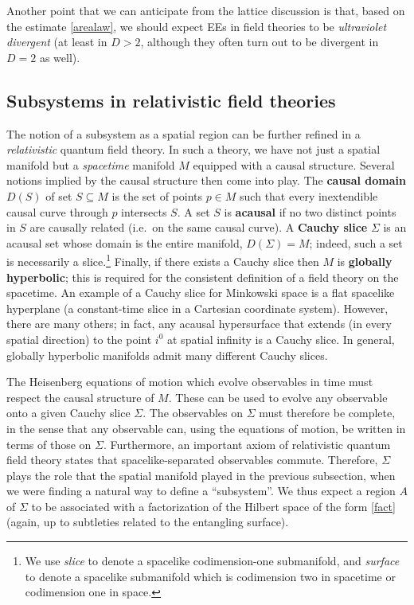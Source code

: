 \documentclass[11pt]{article}
\begin{document}
Another point that we can anticipate from the lattice discussion is that, based on the estimate \eqref{arealaw}, we should expect EEs in field theories to be \emph{ultraviolet divergent} (at least in $D>2$, although they often turn out to be divergent in $D=2$ as well).


\subsection{Subsystems in relativistic field theories}
\label{sec:subsystem relativistic}

The notion of a subsystem as a spatial region can be further refined in a \emph{relativistic} quantum field theory. In such a theory, we have not just a spatial manifold but a \emph{spacetime} manifold $M$ equipped with a causal structure. Several notions implied by the causal structure then come into play. The \textbf{causal domain} $D(S)$ of set $S\subseteq M$ is the set of points $p\in M$ such that every inextendible causal curve through $p$ intersects $S$. A set $S$ is \textbf{acausal} if no two distinct points in $S$ are causally related (i.e.\ on the same causal curve). A \textbf{Cauchy slice} $\Sigma$ is an acausal set whose domain is the entire manifold, $D(\Sigma) = M$; indeed, such a set is necessarily a slice.\footnote{We use \emph{slice} to denote a spacelike codimension-one submanifold, and \emph{surface} to denote a spacelike submanifold which is codimension two in spacetime or codimension one in space.} Finally, if there exists a Cauchy slice then $M$ is \textbf{globally hyperbolic}; this is required for the consistent definition of a field theory on the spacetime. An example of a Cauchy slice for Minkowski space is a flat spacelike hyperplane (a constant-time slice in a Cartesian coordinate system). However, there are many others; in fact, any acausal hypersurface that extends (in every spatial direction) to the point $i^0$ at spatial infinity is a Cauchy slice. In general, globally hyperbolic manifolds admit many different Cauchy slices.

The Heisenberg equations of motion which evolve observables in time must respect the causal structure of $M$. These can be used to evolve any observable onto a given Cauchy slice $\Sigma$. The observables on $\Sigma$ must therefore be complete, in the sense that any observable can, using the equations of motion, be written in terms of those on $\Sigma$. Furthermore, an important axiom of relativistic quantum field theory states that spacelike-separated observables commute. Therefore, $\Sigma$ plays the role that the spatial manifold played in the previous subsection, when we were finding a natural way to define a ``subsystem''. We thus expect a region $A$ of $\Sigma$ to be associated with a factorization of the Hilbert space of the form \eqref{fact} (again, up to subtleties related to the entangling surface).
\end{document}
